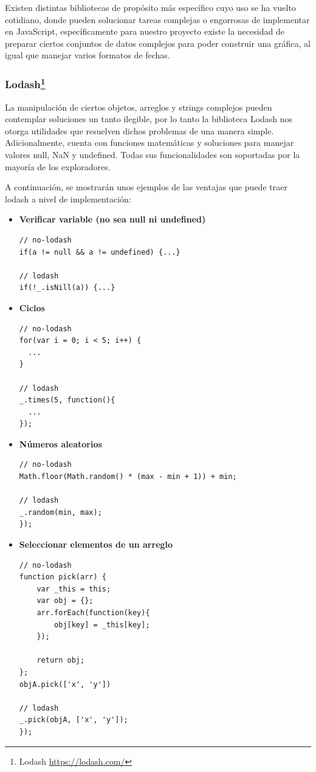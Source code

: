 Existen distintas bibliotecas de propósito más específico cuyo uso se ha vuelto cotidiano, donde pueden solucionar tareas complejas o engorrosas de implementar en JavaScript, específicamente para nuestro proyecto existe la necesidad de preparar ciertos conjuntos de datos complejos para poder construir una gráfica, al igual que manejar varios formatos de fechas.

\subsubsection[Lodash]{Lodash\footnote{Lodash \url{https://lodash.com/}}}

La manipulación de ciertos objetos, arreglos y strings complejos pueden contemplar soluciones un tanto ilegible, por lo tanto la biblioteca Lodash nos otorga utilidades que resuelven dichos problemas de una manera simple. Adicionalmente, cuenta con funciones matemáticas y soluciones para manejar valores null, NaN y undefined. Todas sus funcionalidades son soportadas por la mayoría de los exploradores.

A continuación, se mostrarán unos ejemplos de las ventajas que puede traer lodash a nivel de implementación:

\begin{itemize}
\item\textbf{Verificar variable (no sea null ni undefined)}
\begin{verbatim}
// no-lodash
if(a != null && a != undefined) {...}

// lodash
if(!_.isNill(a)) {...}
\end{verbatim}

\item\textbf{Ciclos}
\begin{verbatim}
// no-lodash
for(var i = 0; i < 5; i++) {
  ...
}

// lodash
_.times(5, function(){
  ...
});
\end{verbatim}

\item\textbf{Números aleatorios}
\begin{verbatim}
// no-lodash
Math.floor(Math.random() * (max - min + 1)) + min;

// lodash
_.random(min, max);
});
\end{verbatim}

\item\textbf{Seleccionar elementos de un arreglo}
\begin{verbatim}
// no-lodash
function pick(arr) {
    var _this = this;
    var obj = {};
    arr.forEach(function(key){
        obj[key] = _this[key];
    });

    return obj;
};
objA.pick(['x', 'y'])

// lodash
_.pick(objA, ['x', 'y']);
});
\end{verbatim}
\end{itemize}

